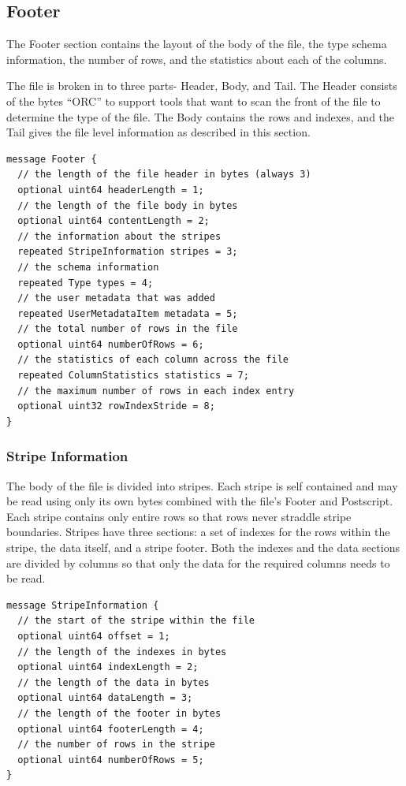 \documentclass{article}
\begin{document}
\subsection{Footer}

The Footer section contains the layout of the body of the file, the
type schema information, the number of rows, and the statistics about
each of the columns. 

The file is broken in to three parts- Header, Body, and Tail. The
Header consists of the bytes ``ORC'' to support tools that want to
scan the front of the file to determine the type of the file. The Body
contains the rows and indexes, and the Tail gives the file level
information as described in this section.

\begin{verbatim}
message Footer {
  // the length of the file header in bytes (always 3)
  optional uint64 headerLength = 1;
  // the length of the file body in bytes
  optional uint64 contentLength = 2;
  // the information about the stripes
  repeated StripeInformation stripes = 3;
  // the schema information
  repeated Type types = 4;
  // the user metadata that was added
  repeated UserMetadataItem metadata = 5;
  // the total number of rows in the file
  optional uint64 numberOfRows = 6;
  // the statistics of each column across the file
  repeated ColumnStatistics statistics = 7;
  // the maximum number of rows in each index entry
  optional uint32 rowIndexStride = 8;
}
\end{verbatim}

\subsubsection{Stripe Information}

The body of the file is divided into stripes. Each stripe is self
contained and may be read using only its own bytes combined with the
file's Footer and Postscript. Each stripe contains only entire rows so
that rows never straddle stripe boundaries. Stripes have three
sections: a set of indexes for the rows within the stripe, the data
itself, and a stripe footer. Both the indexes and the data sections
are divided by columns so that only the data for the required columns
needs to be read.

\begin{verbatim}
message StripeInformation {
  // the start of the stripe within the file
  optional uint64 offset = 1;
  // the length of the indexes in bytes
  optional uint64 indexLength = 2;
  // the length of the data in bytes
  optional uint64 dataLength = 3;
  // the length of the footer in bytes
  optional uint64 footerLength = 4;
  // the number of rows in the stripe
  optional uint64 numberOfRows = 5;
}
\end{verbatim}
\end{document}
